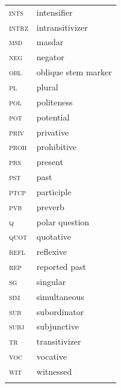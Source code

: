 \documentclass[output=paper,%
colorlinks,citecolor=brown,
showindex
]{langscibook}
\begin{document}
\begin{tabularx}{.45\textwidth}{lQ}
\textsc{ints} & intensifier\\
\textsc{intrz} & intransitivizer \\
\textsc{msd} & masdar \\
\textsc{neg} & negator\\
\textsc{obl} & oblique stem marker\\
\textsc{pl} & plural\\
\textsc{pol} & politeness \\
\textsc{pot} & potential \\
\textsc{priv} & privative\\
\textsc{proh} & prohibitive\\
\textsc{prs} & present\\
\textsc{pst} & past\\
\textsc{ptcp} & participle\\
\textsc{pvb} & preverb\\
\textsc{q} & polar question\\
\textsc{quot} & quotative \\
\textsc{refl} & reflexive\\
\textsc{rep} & reported past\\
\textsc{sg} & singular \\
\textsc{sim} & simultaneous\\
\textsc{sub} & subordinator\\
\textsc{subj} & subjunctive\\
\textsc{tr} & transitivizer\\
\textsc{voc} & vocative \\
\textsc{wit} & witnessed \\
\\
\end{tabularx}


\printbibliography[heading=subbibliography,notkeyword=this]
\end{document}
